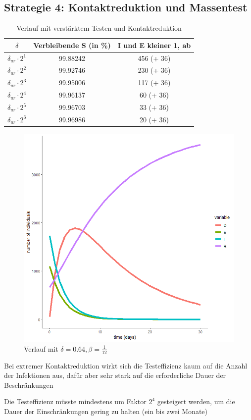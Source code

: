 \documentclass{scrartcl}
\begin{document}
\subsection{Strategie 4: Kontaktreduktion und Massentest}
	\begin{table}[h]
		\caption{Verlauf mit verstärktem Testen und Kontaktreduktion}
		\centering
		\begin{tabular}{@{}ccc@{}}
			\toprule
			$\delta$ & Verbleibende S (in \%) & I und E kleiner 1, ab\\ 
			\midrule
			 $\delta_{ur} \cdot 2^1$ & 99.88242 & 456 (+ 36) \\ 
			 $\delta_{ur} \cdot 2^2$ & 99.92746 & 230 (+ 36)\\  
			 $\delta_{ur} \cdot 2^3$ & 99.95006 & 117 (+ 36) \\ 
			 $\delta_{ur} \cdot 2^4$ & 99.96137 & 60 (+ 36)\\ 
			 $\delta_{ur} \cdot 2^5$ & 99.96703 & 33 (+ 36)\\ 
			 $\delta_{ur} \cdot 2^6$ & 99.96986 & 20 (+ 36)\\ 
			\bottomrule
		\end{tabular}
	\end{table}
	\begin{figure}[h]
        	\centering
		\includegraphics[scale=0.5]{delta=0,64,beta=1durch12,ohne_s.png}
		\caption{Verlauf mit $\delta = 0.64, \beta = \frac{1}{12}$}
	\end{figure}
	\begin{arrowlist}
		\item Bei extremer Kontaktreduktion wirkt sich die Testeffizienz kaum auf die Anzahl der Infektionen aus, dafür aber sehr stark auf die erforderliche Dauer der Beschränkungen
		\item Die Testeffizienz müsste mindestens um Faktor $2^4$ gesteigert werden, um die Dauer der Einschränkungen gering zu halten (ein bis zwei Monate)
	\end{arrowlist}
\end{document}
